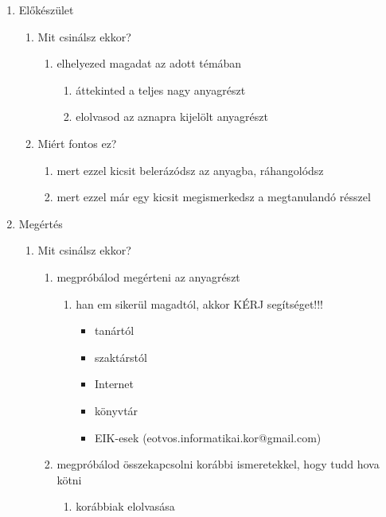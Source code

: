 \documentclass[../Main.tex]{subfiles}
\begin{document}
\begin{enumerate}
    \item Előkészület
    \begin{enumerate}  
        \item Mit csinálsz ekkor?
        \begin{enumerate}
            \item elhelyezed magadat az adott témában
            \begin{enumerate}
                \item áttekinted a teljes nagy anyagrészt
                \item elolvasod az aznapra kijelölt anyagrészt
            \end{enumerate}
        \end{enumerate}
        \item Miért fontos ez?
        \begin{enumerate}
            \item mert ezzel kicsit belerázódsz az anyagba, ráhangolódsz
			\item mert ezzel már egy kicsit megismerkedsz a megtanulandó résszel
		\end{enumerate}
    \end{enumerate}
    \item Megértés
    \begin{enumerate}
        \item Mit csinálsz ekkor?
        \begin{enumerate}
            \item megpróbálod megérteni az anyagrészt
            \begin{enumerate}
                \item han em sikerül magadtól, akkor KÉRJ segítséget!!!
                \begin{itemize}
                    \item tanártól
					\item szaktárstól
					\item Internet
					\item könyvtár
					\item EIK-esek (eotvos.informatikai.kor@gmail.com)
                \end{itemize}
            \end{enumerate}
            \item megpróbálod összekapcsolni korábbi ismeretekkel, hogy tudd hova kötni
            \begin{enumerate}
                \item korábbiak elolvasása

\end{enumerate}
\end{enumerate}
\end{enumerate}
\end{enumerate}
\end{document}
